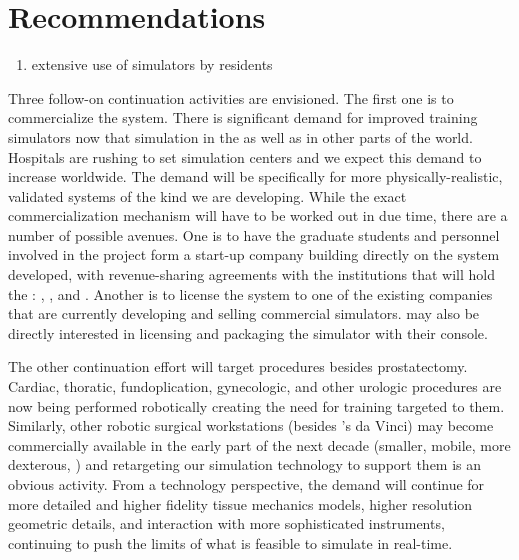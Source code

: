 
\chapter{Recommendations}\label{chp:recommendations}

\begin{enumerate}
  \item extensive use of simulators by residents
\end{enumerate}

Three follow-on continuation activities are envisioned. The first one is to commercialize the system. There is significant demand for improved training simulators now that simulation in the  as well as in other parts of the world. Hospitals are rushing to set simulation centers and we expect this demand to increase worldwide. The demand will be specifically for more physically-realistic, validated systems of the kind we are developing. While the exact commercialization mechanism will have to be worked out in due time, there are a number of possible avenues. One is to have the graduate students and personnel involved in the project form a start-up company building directly on the system developed, with revenue-sharing agreements with the institutions that will hold the : , , and . Another is to license the system to one of the existing companies that are currently developing and selling commercial simulators.  may also be directly interested in licensing and packaging the simulator with their console.

The other continuation effort will target procedures besides prostatectomy. Cardiac, thoratic, fundoplication, gynecologic, and other urologic procedures are now being performed robotically creating the need for training targeted to them. Similarly, other robotic surgical workstations (besides 's da Vinci) may become commercially available in the early part of the next decade (smaller, mobile, more dexterous, \etc) and retargeting our simulation technology to support them is an obvious activity. From a technology perspective, the demand will continue for more detailed and higher fidelity tissue mechanics models, higher resolution geometric details, and interaction with more sophisticated instruments, continuing to push the limits of what is feasible to simulate in real-time.

